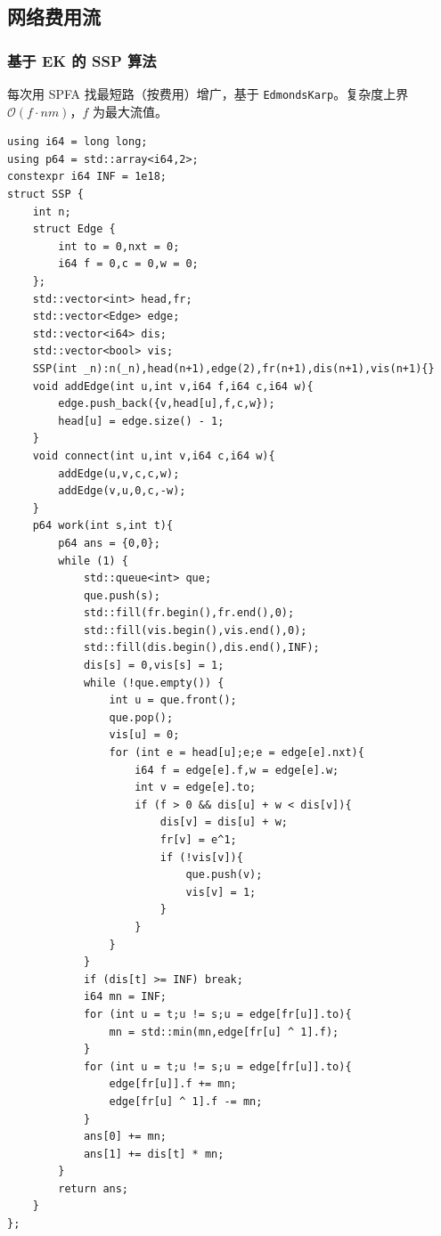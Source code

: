 \subsection{网络费用流}

\subsubsection{基于 EK 的 SSP 算法}

每次用 SPFA 找最短路（按费用）增广，基于 \texttt{EdmondsKarp}。复杂度上界 $\mathcal{O}(f\cdot nm)$，$f$ 为最大流值。

\begin{lstlisting}
using i64 = long long;
using p64 = std::array<i64,2>;
constexpr i64 INF = 1e18;
struct SSP {
    int n;
    struct Edge {
        int to = 0,nxt = 0;
        i64 f = 0,c = 0,w = 0;
    };
    std::vector<int> head,fr;
    std::vector<Edge> edge;
    std::vector<i64> dis;
    std::vector<bool> vis;
    SSP(int _n):n(_n),head(n+1),edge(2),fr(n+1),dis(n+1),vis(n+1){}
    void addEdge(int u,int v,i64 f,i64 c,i64 w){
        edge.push_back({v,head[u],f,c,w});
        head[u] = edge.size() - 1;
    }
    void connect(int u,int v,i64 c,i64 w){
        addEdge(u,v,c,c,w);
        addEdge(v,u,0,c,-w);
    }
    p64 work(int s,int t){
        p64 ans = {0,0};
        while (1) {
            std::queue<int> que;
            que.push(s);
            std::fill(fr.begin(),fr.end(),0);
            std::fill(vis.begin(),vis.end(),0);
            std::fill(dis.begin(),dis.end(),INF);
            dis[s] = 0,vis[s] = 1;
            while (!que.empty()) {
                int u = que.front();
                que.pop();
                vis[u] = 0;
                for (int e = head[u];e;e = edge[e].nxt){
                    i64 f = edge[e].f,w = edge[e].w;
                    int v = edge[e].to;
                    if (f > 0 && dis[u] + w < dis[v]){
                        dis[v] = dis[u] + w;
                        fr[v] = e^1;
                        if (!vis[v]){
                            que.push(v);
                            vis[v] = 1;
                        }
                    }
                }
            }
            if (dis[t] >= INF) break;
            i64 mn = INF;
            for (int u = t;u != s;u = edge[fr[u]].to){
                mn = std::min(mn,edge[fr[u] ^ 1].f);
            }
            for (int u = t;u != s;u = edge[fr[u]].to){
                edge[fr[u]].f += mn;
                edge[fr[u] ^ 1].f -= mn;
            }
            ans[0] += mn;
            ans[1] += dis[t] * mn;
        }
        return ans;
    }
};
\end{lstlisting}

